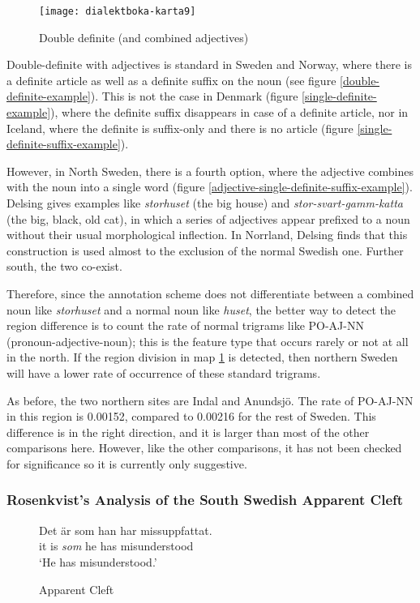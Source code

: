 \begin{figure}
  \texttt{[image: dialektboka-karta9]}
  \caption{Double definite (and combined adjectives)}
  \label{double-definite-map}
\end{figure}

Double-definite with adjectives is standard in Sweden and Norway,
where there is a definite article as well as a definite suffix on the
noun (see figure \ref{double-definite-example}). This is not the case
in Denmark (figure \ref{single-definite-example}), where the definite
suffix disappears in case of a definite article, nor in Iceland, where
the definite is suffix-only and there is no article (figure
\ref{single-definite-suffix-example}).

However, in North Sweden, there is a fourth option, where the
adjective combines with the noun into a single word (figure
\ref{adjective-single-definite-suffix-example}). Delsing gives
examples like {\it storhuset} (the big house) and {\it
  stor-svart-gamm-katta} (the big, black, old cat), in which a series
of adjectives appear prefixed to a noun without their usual
morphological inflection. In Norrland, Delsing finds that this
construction is used almost to the exclusion of the normal Swedish
one. Further south, the two co-exist.


Therefore, since the annotation scheme does not differentiate between
a combined noun like {\it storhuset} and a normal noun like {\it
  huset}, the better way to detect the region difference is to count
the rate of normal trigrams like PO-AJ-NN (pronoun-adjective-noun);
this is the feature type that occurs rarely or not at all in the
north. If the region division in map \ref{double-definite-map} is
detected, then northern Sweden will have a lower rate of occurrence of
these standard trigrams.

As before, the two northern sites are Indal and Anundsj\"o. The rate
of PO-AJ-NN in this region is 0.00152, compared to 0.00216 for the
rest of Sweden. This difference is in the right direction, and it is
larger than most of the other comparisons here. However, like the
other comparisons, it has not been checked for significance so it is
currently only suggestive.

\subsubsection{Rosenkvist's Analysis of the South Swedish Apparent Cleft}

\begin{figure}
 \gll Det \"ar som han har missuppfattat. \\
  it is {\it som} he has misunderstood \\
  \trans `He has misunderstood.'
  \caption{Apparent Cleft}
  \label{apparent-cleft-example1}
\end{figure}

